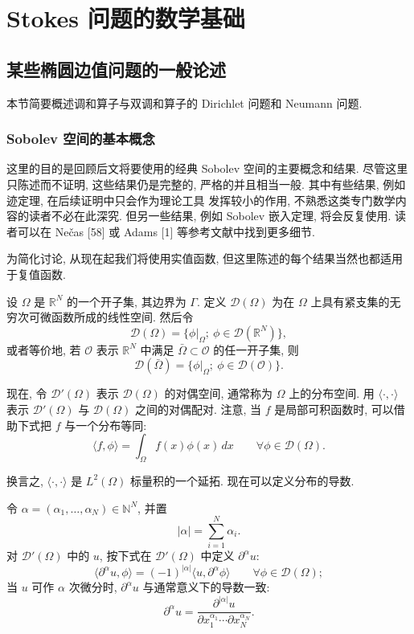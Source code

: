 \providecommand{\theHstatement}{\thestatement}

\chapter{Stokes 问题的数学基础}\label{chap:stokes-foundations}
\section{某些椭圆边值问题的一般论述}\label{sec:elliptic-bvp-generalities}

本节简要概述调和算子与双调和算子的 Dirichlet 问题和 Neumann 问题.

\subsection{Sobolev 空间的基本概念}\label{subsec:sobolev-basic-concepts}

这里的目的是回顾后文将要使用的经典 Sobolev 空间的主要概念和结果. 尽管这里只陈述而不证明,
这些结果仍是完整的, 严格的并且相当一般. 其中有些结果, 例如迹定理, 在后续证明中只会作为理论工具
发挥较小的作用, 不熟悉这类专门数学内容的读者不必在此深究. 但另一些结果, 例如 Sobolev 嵌入定理,
将会反复使用. 读者可以在 Nečas [58] 或 Adams [1] 等参考文献中找到更多细节.

为简化讨论, 从现在起我们将使用实值函数, 但这里陈述的每个结果当然也都适用于复值函数.

设 $\Omega$ 是 $\mathbb R^N$ 的一个开子集, 其边界为 $\Gamma$. 定义 $\mathcal D(\Omega)$ 为在
$\Omega$ 上具有紧支集的无穷次可微函数所成的线性空间. 然后令
\[
  \mathcal D(\Omega)=\{\phi|_\Omega;\ \phi\in\mathcal D(\mathbb R^N)\},
\]
或者等价地, 若 $\mathcal O$ 表示 $\mathbb R^N$ 中满足 $\bar\Omega\subset\mathcal O$ 的任一开子集, 则
\[
  \mathcal D(\bar\Omega)=\{\phi|_\Omega;\ \phi\in\mathcal D(\mathcal O)\}.
\]

现在, 令 $\mathcal D'(\Omega)$ 表示 $\mathcal D(\Omega)$ 的对偶空间, 通常称为 $\Omega$ 上的分布空间.
用 $\langle\cdot,\cdot\rangle$ 表示 $\mathcal D'(\Omega)$ 与 $\mathcal D(\Omega)$ 之间的对偶配对.
注意, 当 $f$ 是局部可积函数时, 可以借助下式把 $f$ 与一个分布等同:
\[
  \langle f,\phi\rangle=\int_\Omega f(x)\phi(x)\,dx
  \qquad\forall\phi\in\mathcal D(\Omega).
\]

换言之, $\langle\cdot,\cdot\rangle$ 是 $L^2(\Omega)$ 标量积的一个延拓. 现在可以定义分布的导数.\par
\noindent 令 $\alpha=(\alpha_1,\ldots,\alpha_N)\in\mathbb N^N$, 并置
\[
  |\alpha|=\sum_{i=1}^N\alpha_i.
\]
对 $\mathcal D'(\Omega)$ 中的 $u$, 按下式在 $\mathcal D'(\Omega)$ 中定义 $\partial^\alpha u$:
\[
  \langle\partial^\alpha u,\phi\rangle
  =(-1)^{|\alpha|}\langle u,\partial^\alpha\phi\rangle
  \qquad\forall\phi\in\mathcal D(\Omega);
\]
当 $u$ 可作 $\alpha$ 次微分时, $\partial^\alpha u$ 与通常意义下的导数一致:
\[
  \partial^\alpha u=
  \frac{\partial^{|\alpha|}u}
       {\partial x_1^{\alpha_1}\cdots\partial x_N^{\alpha_N}}.
\]

